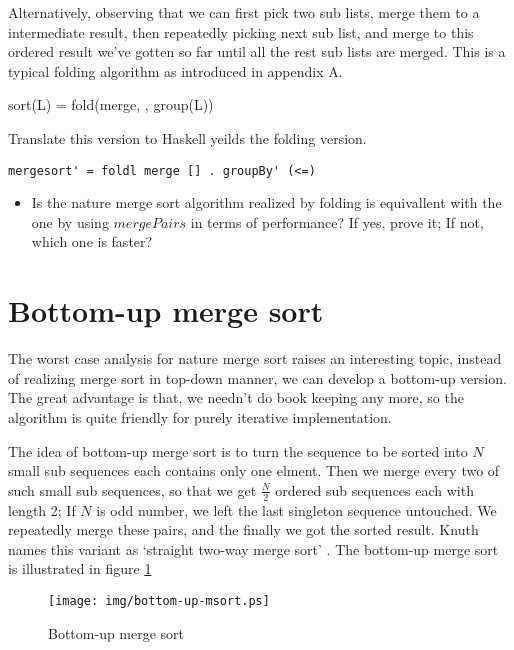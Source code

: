 \documentclass{article}
\begin{document}
Alternatively, observing that we can first pick two sub lists, merge them to a intermediate result, then repeatedly
picking next sub list, and merge to this ordered result we've gotten so far until all the rest sub lists are merged.
This is a typical folding algorithm as introduced in appendix A.

\be
sort(L) = fold(merge, \Phi, group(L))
\ee

Translate this version to Haskell yeilds the folding version.

\lstset{language=Haskell}
\begin{lstlisting}
mergesort' = foldl merge [] . groupBy' (<=)
\end{lstlisting}

\begin{Exercise}
\begin{itemize}
  \item Is the nature merge sort algorithm realized by folding is equivallent with the one by using $mergePairs$ in terms
of performance? If yes, prove it; If not, which one is faster?
\end{itemize}
\end{Exercise}

\section{Bottom-up merge sort}

The worst case analysis for nature merge sort raises an interesting topic, instead of realizing merge sort in
top-down manner, we can develop a bottom-up version. The great advantage is that, we needn't do book keeping
any more, so the algorithm is quite friendly for purely iterative implementation.

The idea of bottom-up merge sort is to turn the sequence to be sorted into $N$ small sub sequences each contains
only one elment. Then we merge every two of such small sub sequences, so that we get $\frac{N}{2}$ ordered
sub sequences each with length 2; If $N$ is odd number, we left the last singleton sequence untouched.
We repeatedly merge these pairs, and the finally we got the sorted result. Knuth names this variant as
`straight two-way merge sort' \cite{TAOCP}. The bottom-up merge sort is illustrated in figure \ref{fig:bottom-up-msort}

\begin{figure}[htbp]
 \centering
 \texttt{[image: img/bottom-up-msort.ps]}
 \caption{Bottom-up merge sort}
 \label{fig:bottom-up-msort}
\end{figure}
\end{document}

